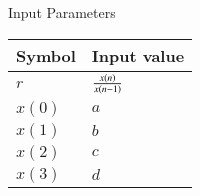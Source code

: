 \setlength{\arrayrulewidth}{0.3mm}
\setlength{\tabcolsep}{12pt}
\renewcommand{\arraystretch}{1.3}


\begin{center}
\caption{Input Parameters}
\begin{tabular}{ |p{2.0cm}|p{2.0cm}| }

\hline
 {Symbol}&{Input value}\\
\hline
$r$ & $\frac{x\left(n\right)}{x\left(n-1\right)}$\\
\hline
$x(0) $ & $a$ \\
\hline
$x(1) $ & $b$ \\
\hline
$x(2) $ & $c$ \\
\hline
$x(3) $ & $d$ \\
\hline

\end{tabular}
\end{center}
